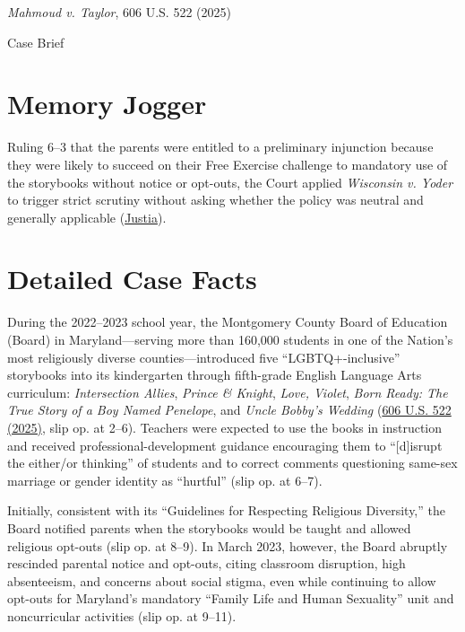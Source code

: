 \documentclass[12pt]{article}
\begin{document}
\begin{center}
{\LARGE \textit{Mahmoud v. Taylor}, 606 U.S. 522 (2025)\par}
\vspace{0.8em}
{\large Case Brief\par}
\end{center}
\vspace{1em}

\section{Memory Jogger}
Ruling 6--3 that the parents were entitled to a preliminary injunction because they were likely to succeed on their Free Exercise challenge to mandatory use of the storybooks without notice or opt-outs, the Court applied \textit{Wisconsin v. Yoder} to trigger strict scrutiny without asking whether the policy was neutral and generally applicable (\href{https://supreme.justia.com/cases/federal/us/606/24-297/}{Justia}).

\section{Detailed Case Facts}
During the 2022--2023 school year, the Montgomery County Board of Education (Board) in Maryland---serving more than 160,000 students in one of the Nation's most religiously diverse counties---introduced five ``LGBTQ+-inclusive'' storybooks into its kindergarten through fifth-grade English Language Arts curriculum: \textit{Intersection Allies}, \textit{Prince \& Knight}, \textit{Love, Violet}, \textit{Born Ready: The True Story of a Boy Named Penelope}, and \textit{Uncle Bobby's Wedding} (\href{https://www.law.cornell.edu/supremecourt/text/24-297}{606 U.S. 522 (2025)}, slip op. at 2--6). Teachers were expected to use the books in instruction and received professional-development guidance encouraging them to ``[d]isrupt the either/or thinking'' of students and to correct comments questioning same-sex marriage or gender identity as ``hurtful'' (slip op. at 6--7).

Initially, consistent with its ``Guidelines for Respecting Religious Diversity,'' the Board notified parents when the storybooks would be taught and allowed religious opt-outs (slip op. at 8--9). In March 2023, however, the Board abruptly rescinded parental notice and opt-outs, citing classroom disruption, high absenteeism, and concerns about social stigma, even while continuing to allow opt-outs for Maryland's mandatory ``Family Life and Human Sexuality'' unit and noncurricular activities (slip op. at 9--11).
\end{document}
